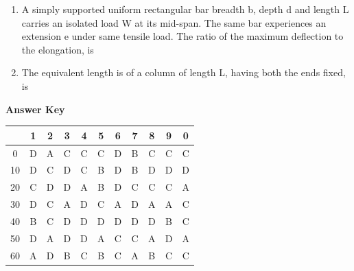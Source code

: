 \documentclass[11pt,a4paper]{article}
\begin{document}
\begin{enumerate}
\\
\item{A simply supported uniform rectangular bar breadth b, depth d and length L carries an isolated load W at its mid-span. The same bar experiences an extension e under same tensile load. The ratio of the maximum deflection to the elongation, is}
\\
\item{The equivalent length is of a column of length L, having both the ends fixed, is}
\\
\end{enumerate}
\textbf{Answer Key}
\begin{tabular}{ | c | c c c c c c c c c c | }
\hline
 & 1 & 2 & 3 & 4 & 5 & 6 & 7 & 8 & 9 & 0 \\
\hline
0 & D & A & C & C & C & D & B & C & C & C \\
10 & D & C & D & C & B & D & B & D & D & D \\
20 & C & D & D & A & B & D & C & C & C & A \\
30 & D & C & A & D & C & A & D & A & A & C \\
40 & B & C & D & D & D & D & D & D & B & C \\
50 & D & A & D & D & A & C & C & A & D & A \\
60 & A & D & B & C & B & C & A & B & C & C \\
\hline
\end{tabular}
\end{document}
